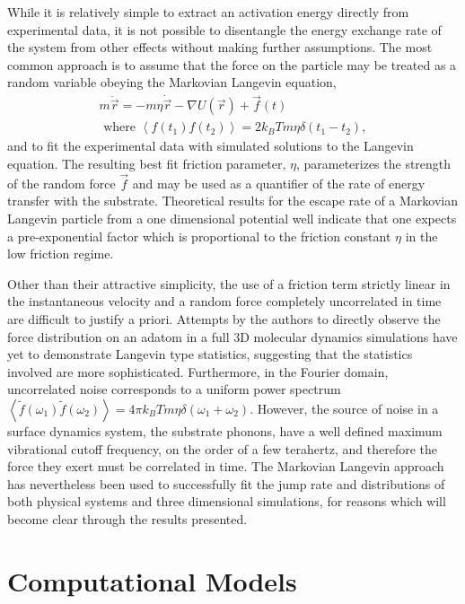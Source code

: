 \documentclass[7pt]{article}
\begin{document}
While it is relatively simple to extract an activation energy directly from experimental data\cite{Diamant,Alexandrowicz2006}, it is not possible to disentangle the energy exchange rate of the system from other effects without making further assumptions. The most common approach is to assume that the force on the particle may be treated as a random variable obeying the Markovian Langevin equation,
\begin{equation}
\begin{gathered}
	m\ddot{\vec{r}}=-m\eta\dot{\vec{r}}-\nabla U(\vec{r})+\vec{f}(t) \\ 
	\text{ where } \left<f(t_1)f(t_2)\right>=2k_BTm\eta\delta(t_1-t_2),
\end{gathered}
	\label{eq:langevin}
\end{equation}
and to fit the experimental data with simulated solutions to the Langevin equation. The resulting best fit friction parameter, $\eta$, parameterizes the strength of the random force $\vec{f}$ and may be used as a quantifier of the rate of energy transfer with the substrate. Theoretical results for the escape rate of a Markovian Langevin particle from a one dimensional potential well indicate that one expects a pre-exponential factor which is proportional to the friction constant $\eta$ in the low friction regime\cite{Kramers, Zwanzig}. 

Other than their attractive simplicity, the use of a friction term strictly linear in the instantaneous velocity and a random force completely uncorrelated in time are difficult to justify a priori. Attempts by the authors to directly observe the force distribution on an adatom in a full 3D molecular dynamics simulations have yet to demonstrate Langevin type statistics, suggesting that the statistics involved are more sophisticated. Furthermore, in the Fourier domain, uncorrelated noise corresponds to a uniform power spectrum $\left<\tilde{f}(\omega_1)\tilde{f}(\omega_2)\right>=4\pi k_BTm\eta\delta(\omega_1+\omega_2)$. However, the source of noise in a surface dynamics system, the substrate phonons, have a well defined maximum vibrational cutoff frequency, on the order of a few terahertz, and therefore the force they exert must be correlated in time\cite{Sinha}. The Markovian Langevin approach has nevertheless been used to successfully fit the jump rate and distributions of both physical systems\cite{someone} and three dimensional simulations\cite{Diamant}, for reasons which will become clear through the results presented. 

\section*{Computational Models}
\end{document}
